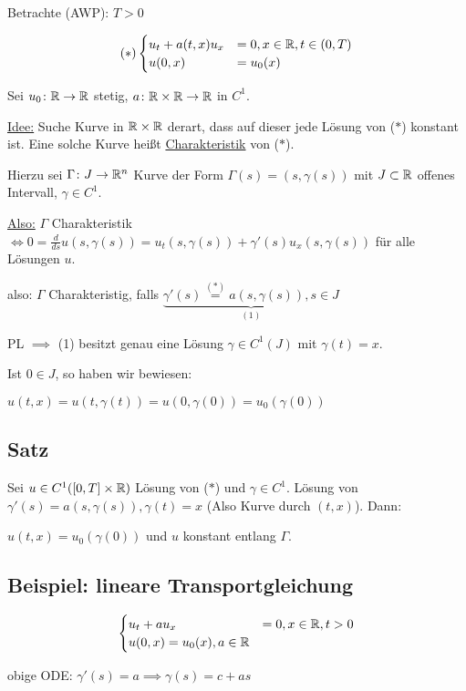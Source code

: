 Betrachte (AWP): $T > 0$

$$
(\ast) 
\begin{cases}
  u_t + a(t,x)u_x &= 0, x \in \mathbb{R}, t \in (0,T) \\
  u(0,x) &= u_0(x)
\end{cases}
$$

Sei $u_0 \colon \mathbb{R} \to \mathbb{R}$ stetig, $a \colon \mathbb{R} \times \mathbb{R} \to \mathbb{R}$ in $C^1$.

\underline{Idee:} Suche Kurve in $\mathbb{R} \times \mathbb{R}$ derart, dass auf dieser jede Lösung von ($\ast$) konstant ist.
Eine solche Kurve heißt \underline{Charakteristik} von ($\ast$).

Hierzu sei $\Gamma \colon J \to \mathbb{R}^n$ Kurve der Form $\Gamma(s) = (s, \gamma(s))$ mit $J \subset \mathbb{R}$ offenes Intervall, $\gamma \in C^1$.

\underline{Also:} $\Gamma$ Charakteristik $\iff 0 = \frac{d}{ds} u(s,\gamma(s)) = u_t(s,\gamma(s)) + \gamma'(s) u_x(s,\gamma(s))$ für alle Lösungen $u$.

also: $\Gamma$ Charakteristig, falls $\underbrace{\gamma'(s) \overset{(\ast)}{=} a(s,\gamma(s)), s \in J}_{(1)}$

PL $\implies$ (1) besitzt genau eine Lösung $\gamma \in C^1(J)$ mit $\gamma(t) = x$.

Ist $0 \in J$, so haben wir bewiesen:

$u(t,x) = u(t, \gamma(t)) = u(0, \gamma(0)) = u_0(\gamma(0))$

\subsection{Satz}

Sei $u \in C^1([0,T] \times \mathbb{R})$ Lösung von ($\ast$) und $\gamma \in C^1$.
Lösung von $\gamma'(s) = a(s,\gamma(s)), \gamma(t) = x$ {\tiny{(Also Kurve durch $(t,x)$)}}. Dann:

$u(t,x) = u_0(\gamma(0))$ und $u$ konstant entlang $\Gamma$.

\subsection{Beispiel: lineare Transportgleichung}

$$
\begin{cases}
  u_t + a u_x &= 0, x \in \mathbb{R}, t> 0 \\
  u(0,x) = u_0(x), a \in \mathbb{R}
\end{cases}
$$

obige ODE: $\gamma'(s) = a \implies \gamma(s) = c + as$

